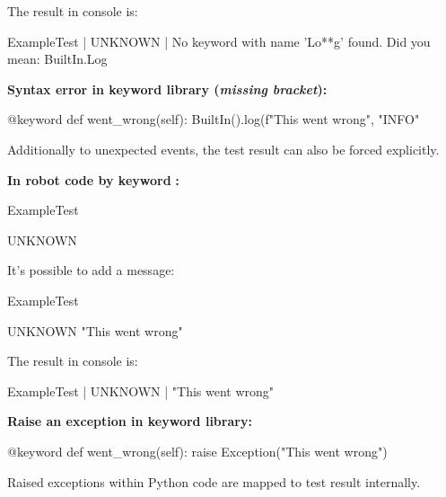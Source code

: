 
The result in console is:

\begin{robotlog}
ExampleTest                                      | UNKNOWN |
No keyword with name 'Lo**g' found. Did you mean:
    BuiltIn.Log
\end{robotlog}

\vspace{2ex}

\textbf{Syntax error in keyword library (\textit{missing bracket}):}

\begin{pythoncode}
@keyword
def went_wrong(self):
    BuiltIn().log(f"This went wrong", "INFO"
\end{pythoncode}

\vspace{2ex}

Additionally to unexpected events, the test result  can also be forced explicitly.

\vspace{2ex}

\textbf{In robot code by keyword} \textbf{:}

\begin{robotcode}
ExampleTest

    UNKNOWN
\end{robotcode}

\newpage

It's possible to add a message:

\begin{robotcode}
ExampleTest

    UNKNOWN    "This went wrong"
\end{robotcode}

\newpage

The result in console is:

\begin{robotlog}
ExampleTest       | UNKNOWN |
"This went wrong"
\end{robotlog}

\vspace{2ex}

\textbf{Raise an exception in keyword library:}

\begin{pythoncode}
    @keyword
    def went_wrong(self):
        raise Exception("This went wrong")
\end{pythoncode}

Raised exceptions within Python code are mapped to test result  internally.



